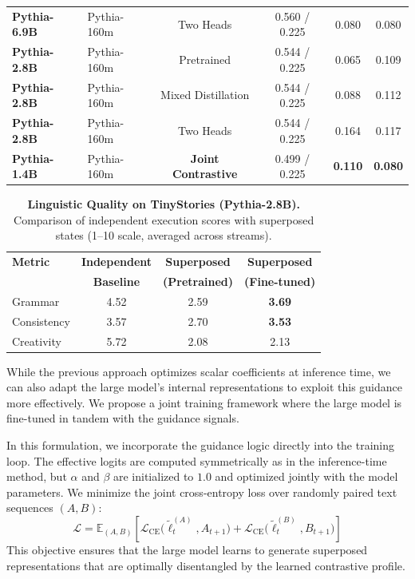 \documentclass{article}
\theoremstyle{plain}
\theoremstyle{definition}
\theoremstyle{remark}
\begin{document}
\begin{table}[t!]
\begin{tabular}{llcccc}
        \midrule
        \textbf{Pythia-6.9B} & Pythia-160m & Two Heads & 0.560 / 0.225 & 0.080 & 0.080 \\
        \textbf{Pythia-2.8B} & Pythia-160m & Pretrained & 0.544 / 0.225 & 0.065 & 0.109 \\
        \textbf{Pythia-2.8B} & Pythia-160m & Mixed Distillation & 0.544 / 0.225 & 0.088 & 0.112 \\
        \textbf{Pythia-2.8B} & Pythia-160m & Two Heads & 0.544 / 0.225 & 0.164 & 0.117 \\
        \textbf{Pythia-1.4B} & Pythia-160m & \textbf{Joint Contrastive} & 0.499 / 0.225 & \textbf{0.110} & \textbf{0.080} \\
        \bottomrule
    \end{tabular}
\end{table}

\begin{table}[b!]
    \small
    \centering
    \caption{\textbf{Linguistic Quality on TinyStories (Pythia-2.8B).} Comparison of independent execution scores with superposed states (1--10 scale, averaged across streams).}
    \label{tab:tinystories_qual}
    \begin{tabular}{lccc}
        \toprule
        \textbf{Metric} & \textbf{Independent} & \textbf{Superposed} & \textbf{Superposed} \\
                        & \textbf{Baseline}    & \textbf{(Pretrained)} & \textbf{(Fine-tuned)} \\
        \midrule
        Grammar         & 4.52 & 2.59 & \textbf{3.69} \\
        Consistency     & 3.57 & 2.70 & \textbf{3.53} \\
        Creativity      & 5.72 & 2.08 & 2.13 \\
        \bottomrule
    \end{tabular}
\end{table}

While the previous approach optimizes scalar coefficients at inference time, we can also adapt the large model's internal representations to exploit this guidance more effectively. We propose a joint training framework where the large model is fine-tuned in tandem with the guidance signals.

In this formulation, we incorporate the guidance logic directly into the training loop. The effective logits are computed symmetrically as in the inference-time method, but $\alpha$ and $\beta$ are initialized to $1.0$ and optimized jointly with the model parameters. We minimize the joint cross-entropy loss over randomly paired text sequences $(A, B)$:
\begin{equation}
\mathcal{L} = \mathbb{E}_{(A,B)} \left[ \mathcal{L}_{\text{CE}}\bigl(\tilde{\ell}^{(A)}_t, A_{t+1}\bigr) + \mathcal{L}_{\text{CE}}\bigl(\tilde{\ell}^{(B)}_t, B_{t+1}\bigr) \right]
\end{equation}
This objective ensures that the large model learns to generate superposed representations that are optimally disentangled by the learned contrastive profile.
\end{document}
